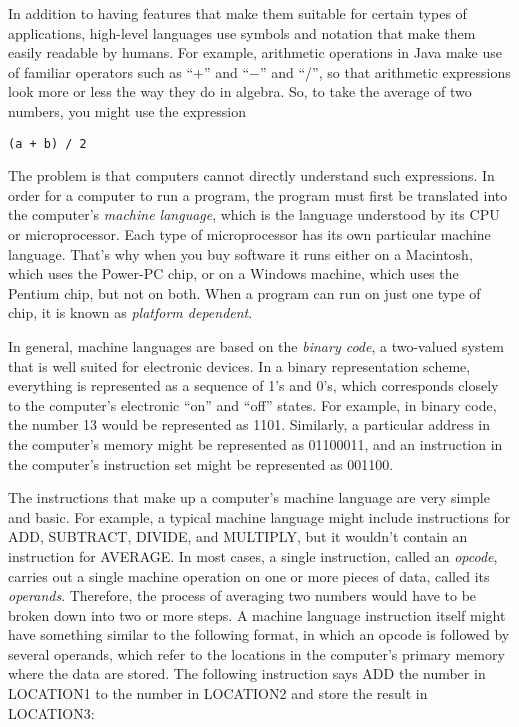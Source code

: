 In addition to having features that make them suitable for certain
types of applications, high-level languages use symbols and notation
that make them easily readable by humans.  For example, arithmetic
operations in Java make use of familiar operators such as ``$+$'' and
``$-$'' and ``/'', so that arithmetic expressions look more or less the
way they do in algebra.  So, to take the average of two numbers, you
might use the expression

\begin{jjjlisting}
\begin{lstlisting}
(a + b) / 2
\end{lstlisting}
\end{jjjlisting}

\noindent The problem is that computers cannot directly understand such
expressions.  In order for a computer to run a program, the program
must first be translated into the computer's {\it machine
language}, which is the language
understood by its CPU or microprocessor.  Each type of microprocessor
has its own particular machine language.  That's why when you buy
software it runs either on a Macintosh, which uses the Power-PC chip,
or on a Windows machine, which uses the Pentium chip, but not on both.
When a program can run on just one type of chip, it is known as
{\it platform dependent}.

In general, machine languages are based on the {\it binary code}, a
two-valued system that is well suited for electronic devices.  In a
binary representation scheme, everything is represented as a sequence
of 1's and 0's, which corresponds closely to the computer's electronic
``on'' and ``off'' states.  For example, in binary code, the number 13
would be represented as 1101. Similarly, a particular address in the
computer's memory might be represented as 01100011, and an instruction
in the computer's instruction set might be represented as 001100.

The instructions that make up a computer's machine language are very
simple and basic.  For example, a typical machine language might
include instructions for ADD, SUBTRACT, DIVIDE, and MULTIPLY, but it
wouldn't contain an instruction for AVERAGE. In most cases, a single
instruction, called an {\em opcode}, carries out a single machine
operation on one or more pieces of data, called its {\em operands}.
Therefore, the process of averaging two numbers would have to be
broken down into two or more steps.  A machine language instruction
itself might have something similar to the following format, in which
an opcode is followed by several operands, which refer to the
locations in the computer's primary memory where the data are stored.
The following instruction says ADD the number in LOCATION1 to the
number in LOCATION2 and store the result in LOCATION3:

